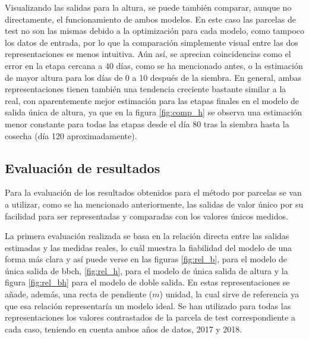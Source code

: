 \par Visualizando las salidas para la altura, se puede también comparar, aunque no directamente, el funcionamiento de ambos modelos. En este caso las parcelas de test no son las mismas debido a la optimización para cada modelo, como tampoco los datos de entrada, por lo que la comparación simplemente visual entre las dos representaciones es menos intuitiva. Aún así, se aprecian coincidencias como el error en la etapa cercana a 40 días, como se ha mencionado antes, o la estimación de mayor altura para los días de 0 a 10 después de la siembra. En general, ambas representaciones tienen también una tendencia creciente bastante similar a la real, con aparentemente mejor estimación para las etapas finales en el modelo de salida única de altura, ya que en la figura \ref{fig:comp_h} se observa una estimación menor constante para todas las etapas desde el día 80 tras la siembra hasta la cosecha (día 120 aproximadamente).

\subsection{Evaluación de resultados}
\par Para la evaluación de los resultados obtenidos para el método por parcelas se van a utilizar, como se ha mencionado anteriormente, las salidas de valor único por su facilidad para ser representadas y comparadas con los valores únicos medidos. 
\\
\par La primera evaluación realizada se basa en la relación directa entre las salidas estimadas y las medidas reales, lo cuál muestra la fiabilidad del modelo de una forma más clara y así puede verse en las figuras \ref{fig:rel_b}, para el modelo de única salida de \gls{bbch}, \ref{fig:rel_h}, para el modelo de única salida de altura y la figura \ref{fig:rel_bh} para el modelo de doble salida. En estas representaciones se añade, además, una recta de pendiente ($m$) unidad, la cual sirve de referencia ya que esa relación representaría un modelo ideal. Se han utilizado para todas las representaciones los valores contrastados de la parcela de test correspondiente a cada caso, teniendo en cuenta ambos años de datos, 2017 y 2018.

